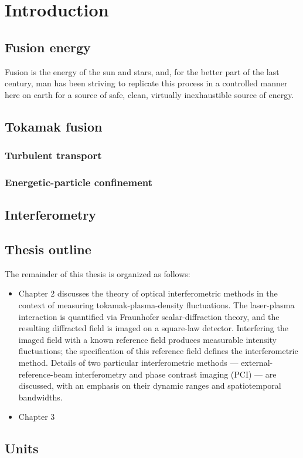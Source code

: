 \chapter{Introduction}


\section{Fusion energy}
Fusion is the energy of the sun and stars, and,
for the better part of the last century,
man has been striving to replicate this process
in a controlled manner here on earth
for a source of safe, clean, virtually inexhaustible source of energy.


\section{Tokamak fusion}
\subsection{Turbulent transport}
\subsection{Energetic-particle confinement}


\section{Interferometry}


\section{Thesis outline}
The remainder of this thesis is organized as follows:

\begin{itemize}
  \item Chapter 2 discusses the theory of optical interferometric methods
    in the context of measuring tokamak-plasma-density fluctuations.
    The laser-plasma interaction is quantified via
    Fraunhofer scalar-diffraction theory, and
    the resulting diffracted field is imaged on a square-law detector.
    Interfering the imaged field with a known reference field
    produces measurable intensity fluctuations;
    the specification of this reference field
    defines the interferometric method.
    Details of two particular interferometric methods ---
    external-reference-beam interferometry and
    phase contrast imaging (PCI) ---
    are discussed, with an emphasis on
    their dynamic ranges and spatiotemporal bandwidths.
  \item Chapter 3
\end{itemize}


\section{Units}
